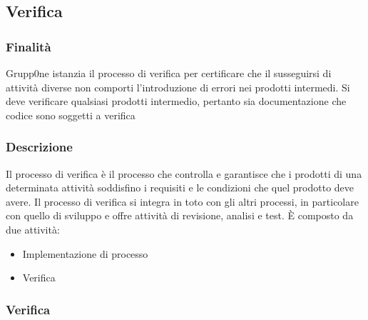 \documentclass[../norme-di-progetto.tex]{subfiles}
\begin{document}
\subsection{Verifica}
\subsubsection{Finalità}
Grupp0ne istanzia il processo di verifica  per certificare che il susseguirsi di attività diverse non comporti l'introduzione di errori nei prodotti intermedi. Si deve verificare qualsiasi prodotti intermedio, pertanto sia documentazione che codice sono soggetti a verifica 
\subsubsection{Descrizione}
Il processo di verifica è il processo che controlla e garantisce che i prodotti di una determinata attività soddisfino i requisiti e le condizioni che quel prodotto deve avere. Il processo di verifica si integra in toto con gli altri processi, in particolare con quello di sviluppo e offre attività di revisione, analisi e test. È composto da due attività:
\begin{itemize}
	\item Implementazione di processo
	\item Verifica 
\end{itemize} 
\subsubsection{Verifica}
\label{subs:verifica}
\end{document}
